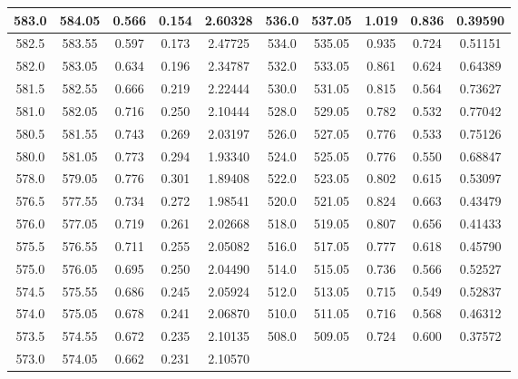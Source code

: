 \documentclass{thureport}
\begin{document}
\begin{table}[H]
\begin{tabular}{|c|c|c|c|c|c|c|c|c|c|}
    \hline
    583.0  & 584.05  & 0.566  & 0.154  & 2.60328  & 536.0  & 537.05  & 1.019  & 0.836  & 0.39590  \bigstrut\\
    \hline
    582.5  & 583.55  & 0.597  & 0.173  & 2.47725  & 534.0  & 535.05  & 0.935  & 0.724  & 0.51151  \bigstrut\\
    \hline
    582.0  & 583.05  & 0.634  & 0.196  & 2.34787  & 532.0  & 533.05  & 0.861  & 0.624  & 0.64389  \bigstrut\\
    \hline
    581.5  & 582.55  & 0.666  & 0.219  & 2.22444  & 530.0  & 531.05  & 0.815  & 0.564  & 0.73627  \bigstrut\\
    \hline
    581.0  & 582.05  & 0.716  & 0.250  & 2.10444  & 528.0  & 529.05  & 0.782  & 0.532  & 0.77042  \bigstrut\\
    \hline
    580.5  & 581.55  & 0.743  & 0.269  & 2.03197  & 526.0  & 527.05  & 0.776  & 0.533  & 0.75126  \bigstrut\\
    \hline
    580.0  & 581.05  & 0.773  & 0.294  & 1.93340  & 524.0  & 525.05  & 0.776  & 0.550  & 0.68847  \bigstrut\\
    \hline
    578.0  & 579.05  & 0.776  & 0.301  & 1.89408  & 522.0  & 523.05  & 0.802  & 0.615  & 0.53097  \bigstrut\\
    \hline
    576.5  & 577.55  & 0.734  & 0.272  & 1.98541  & 520.0  & 521.05  & 0.824  & 0.663  & 0.43479  \bigstrut\\
    \hline
    576.0  & 577.05  & 0.719  & 0.261  & 2.02668  & 518.0  & 519.05  & 0.807  & 0.656  & 0.41433  \bigstrut\\
    \hline
    575.5  & 576.55  & 0.711  & 0.255  & 2.05082  & 516.0  & 517.05  & 0.777  & 0.618  & 0.45790  \bigstrut\\
    \hline
    575.0  & 576.05  & 0.695  & 0.250  & 2.04490  & 514.0  & 515.05  & 0.736  & 0.566  & 0.52527  \bigstrut\\
    \hline
    574.5  & 575.55  & 0.686  & 0.245  & 2.05924  & 512.0  & 513.05  & 0.715  & 0.549  & 0.52837  \bigstrut\\
    \hline
    574.0  & 575.05  & 0.678  & 0.241  & 2.06870  & 510.0  & 511.05  & 0.716  & 0.568  & 0.46312  \bigstrut\\
    \hline
    573.5  & 574.55  & 0.672  & 0.235  & 2.10135  & 508.0  & 509.05  & 0.724  & 0.600  & 0.37572  \bigstrut\\
    \hline
    573.0  & 574.05  & 0.662  & 0.231  & 2.10570  &       &       &       &       &  \bigstrut\\
    \hline
      \end{tabular}%
\end{table}%
  
\end{document}
